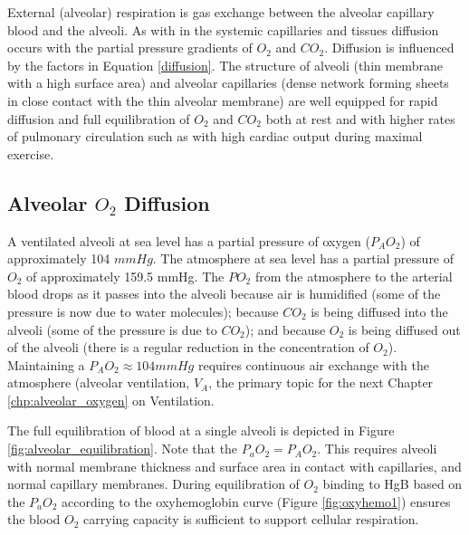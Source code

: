 External (alveolar) respiration is gas exchange between the alveolar capillary blood and the alveoli. As with in the systemic capillaries and tissues diffusion occurs with the partial pressure gradients of $O_2$ and $CO_2$. Diffusion is influenced by the factors in Equation \ref{diffusion}. The structure of alveoli (thin membrane with a high surface area) and alveolar capillaries (dense network forming sheets in close contact with the thin alveolar membrane) are well equipped for rapid diffusion and full equilibration of $O_2$ and $CO_2$ both at rest and with higher rates of pulmonary circulation such as with high cardiac output during maximal exercise.


\subsection{Alveolar $O_2$ Diffusion}

A ventilated alveoli at sea level has a partial pressure of oxygen ($P_AO_2$) of approximately 104 $mmHg$. The atmosphere at sea level has a partial pressure of $O_2$ of approximately 159.5 mmHg. The $PO_2$ from the atmosphere to the arterial blood drops as it passes into the alveoli because air is humidified (some of the pressure is now due to water molecules); because $CO_2$ is being diffused into the alveoli (some of the pressure is due to $CO_2$); and because $O_2$ is being diffused out of the alveoli (there is a regular reduction in the concentration of $O_2$). Maintaining a $P_AO_2 \approx 104 mmHg$ requires continuous air exchange with the atmosphere (alveolar ventilation, $V_A$, the primary topic for the next Chapter \ref{chp:alveolar_oxygen} on Ventilation.

The full equilibration of blood at a single alveoli is depicted in Figure \ref{fig:alveolar_equilibration}. Note that the $P_aO_2 = P_AO_2$. This requires alveoli with normal membrane thickness and surface area in contact with capillaries, and normal capillary membranes. During equilibration of $O_2$ binding to HgB based on the $P_aO_2$ according to the oxyhemoglobin curve (Figure \ref{fig:oxyhemo1}) ensures the blood $O_2$ carrying capacity is sufficient to support cellular respiration. 

